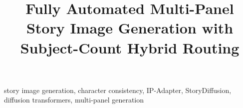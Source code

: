 \documentclass[conference]{IEEEtran}
\begin{document}
\title{Fully Automated Multi-Panel Story Image Generation with Subject-Count Hybrid Routing}

\author{
\and
{}
\and
{}
}

\maketitle

\begin{IEEEkeywords}
story image generation, character consistency, IP-Adapter, StoryDiffusion, diffusion transformers, multi-panel generation
\end{IEEEkeywords}

\begin{abstract}

\end{abstract}













\end{document}
